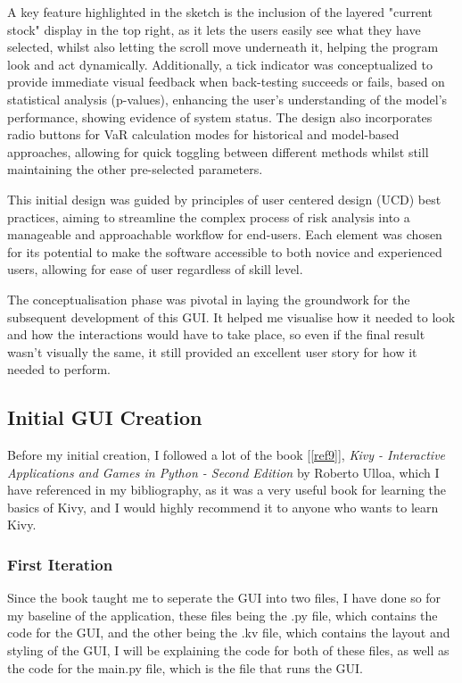 \documentclass{article}
\begin{document}
A key feature highlighted in the sketch is the inclusion of the layered "current stock" display in the top right, as it lets the users easily see what they have selected, whilst also letting the scroll move underneath it, helping the program look and act dynamically. Additionally, a tick indicator was conceptualized to provide immediate visual feedback when back-testing succeeds or fails, based on statistical analysis (p-values), enhancing the user's understanding of the model's performance, showing evidence of system status. The design also incorporates radio buttons for VaR calculation modes for historical and model-based approaches, allowing for quick toggling between different methods whilst still maintaining the other pre-selected parameters.\\\vspace{0.3cm}

This initial design was guided by principles of user centered design (UCD) best practices, aiming to streamline the complex process of risk analysis into a manageable and approachable workflow for end-users. Each element was chosen for its potential to make the software accessible to both novice and experienced users, allowing for ease of user regardless of skill level.\\\vspace{0.3cm}

The conceptualisation phase was pivotal in laying the groundwork for the subsequent development of this GUI. It helped me visualise how it needed to look and how the interactions would have to take place, so even if the final result wasn't visually the same, it still provided an excellent user story for how it needed to perform.

\subsection{Initial GUI Creation}
Before my initial creation, I followed a lot of the book [\ref{ref9}], \textit{Kivy - Interactive Applications and Games in Python - Second Edition} by Roberto Ulloa, which I have referenced in my bibliography, as it was a very useful book for learning the basics of Kivy, and I would highly recommend it to anyone who wants to learn Kivy.

\subsubsection{First Iteration}
Since the book taught me to seperate the GUI into two files, I have done so for my baseline of the application, these files  being the .py file, which contains the code for the GUI, and the other being the .kv file, which contains the layout and styling of the GUI, I will be explaining the code for both of these files, as well as the code for the main.py file, which is the file that runs the GUI.\@\\\vspace{0.3cm}
\end{document}
